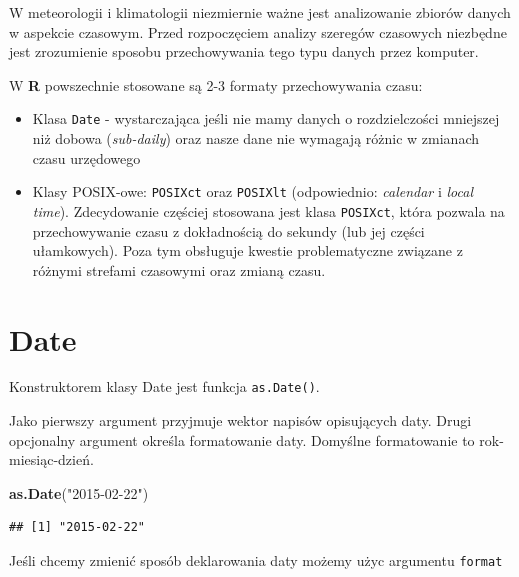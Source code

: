 \documentclass[]{book}
\newenvironment{Shaded}{\begin{snugshade}}{\end{snugshade}}
\newcommand{\KeywordTok}[1]{\textcolor[rgb]{0.13,0.29,0.53}{\textbf{#1}}}
\newcommand{\DataTypeTok}[1]{\textcolor[rgb]{0.13,0.29,0.53}{#1}}
\newcommand{\StringTok}[1]{\textcolor[rgb]{0.31,0.60,0.02}{#1}}
\newcommand{\NormalTok}[1]{#1}
\theoremstyle{definition}
\theoremstyle{definition}
\theoremstyle{definition}
\theoremstyle{remark}
\begin{document}
W meteorologii i klimatologii niezmiernie ważne jest analizowanie
zbiorów danych w aspekcie czasowym. Przed rozpoczęciem analizy szeregów
czasowych niezbędne jest zrozumienie sposobu przechowywania tego typu
danych przez komputer.

W \textbf{R} powszechnie stosowane są 2-3 formaty przechowywania czasu:

\begin{itemize}
\item
  Klasa \texttt{Date} - wystarczająca jeśli nie mamy danych o
  rozdzielczości mniejszej niż dobowa (\emph{sub-daily}) oraz nasze dane
  nie wymagają różnic w zmianach czasu urzędowego
\item
  Klasy POSIX-owe: \texttt{POSIXct} oraz \texttt{POSIXlt} (odpowiednio:
  \emph{calendar} i \emph{local time}). Zdecydowanie częściej stosowana
  jest klasa \texttt{POSIXct}, która pozwala na przechowywanie czasu z
  dokładnością do sekundy (lub jej części ułamkowych). Poza tym
  obsługuje kwestie problematyczne związane z różnymi strefami czasowymi
  oraz zmianą czasu.
\end{itemize}

\section{Date}\label{date}

Konstruktorem klasy Date jest funkcja \texttt{as.Date()}.

Jako pierwszy argument przyjmuje wektor napisów opisujących daty. Drugi
opcjonalny argument określa formatowanie daty. Domyślne formatowanie to
rok-miesiąc-dzień.

\begin{Shaded}
\begin{Highlighting}[]
\KeywordTok{as.Date}\NormalTok{(}\StringTok{"2015-02-22"}\NormalTok{)}
\end{Highlighting}
\end{Shaded}

\begin{verbatim}
## [1] "2015-02-22"
\end{verbatim}

Jeśli chcemy zmienić sposób deklarowania daty możemy użyc argumentu
\texttt{format}

\begin{Shaded}
\end{Shaded}
\end{document}
